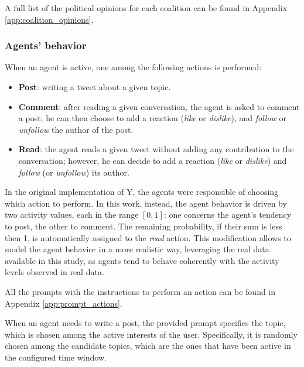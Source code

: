 

A full list of the political opinions for each coalition can be found in Appendix \ref{app:coalition_opinions}.



\subsubsection{Agents' behavior}
When an agent is active, one among the following actions is performed:
\begin{itemize}
    \item \textbf{Post}: writing a tweet about a given topic.
    \item \textbf{Comment}: after reading a given conversation, the agent is asked to comment a post; he can then choose to add a reaction (\textit{like} or \textit{dislike}), and \textit{follow} or \textit{unfollow} the author of the post.
    \item \textbf{Read}: the agent reads a given tweet without adding any contribution to the conversation; however, he can decide to add a reaction (\textit{like} or \textit{dislike}) and \textit{follow} (or \textit{unfollow}) its author.
\end{itemize}

\medskip
In the original implementation of Y, the agents were responsible of choosing which action to perform.
In this work, instead, the agent behavior is driven by two activity values, each in the range $[0,1]$: one concerns the agent's tendency to post, the other to comment. 
The remaining probability, if their sum is less then 1, is automatically assigned to the \textit{read} action.
This modification allows to model the agent behavior in a more realistic way, leveraging the real data available in this study, as agents tend to behave coherently with the activity levels observed in real data.

All the prompts with the instructions to perform an action can be found in Appendix \ref{app:prompt_actions}.

When an agent needs to write a post, the provided prompt specifies the topic, which is chosen among the active interests of the user.
Specifically, it is randomly chosen among the candidate topics, which are the ones that have been active in the configured time window.

